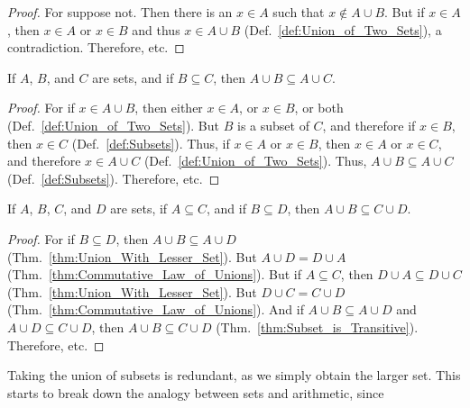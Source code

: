         \begin{proof}
            For suppose not. Then there is an $x\in{A}$ such
            that $x\notin{A}\cup{B}$. But if $x\in{A}$, then
            $x\in{A}$ or $x\in{B}$ and thus $x\in{A}\cup{B}$
            (Def.~\ref{def:Union_of_Two_Sets}), a
            contradiction. Therefore, etc.
        \end{proof}
        \begin{theorem}
            \label{thm:Union_With_Lesser_Set}%
            If $A$, $B$, and $C$ are sets, and if
            $B\subseteq{C}$, then
            $A\cup{B}\subseteq{A}\cup{C}$.
        \end{theorem}
        \begin{proof}
            For if $x\in{A}\cup{B}$, then either $x\in{A}$,
            or $x\in{B}$, or both
            (Def.~\ref{def:Union_of_Two_Sets}). But $B$ is a
            subset of $C$, and therefore if $x\in{B}$, then
            $x\in{C}$ (Def.~\ref{def:Subsets}).
            Thus, if $x\in{A}$ or $x\in{B}$, then
            $x\in{A}$ or $x\in{C}$, and therefore
            $x\in{A}\cup{C}$ (Def.~\ref{def:Union_of_Two_Sets}).
            Thus, $A\cup{B}\subseteq{A}\cup{C}$
            (Def.~\ref{def:Subsets}). Therefore, etc.
        \end{proof}
        \begin{theorem}
            If $A$, $B$, $C$, and $D$ are sets, if
            $A\subseteq{C}$, and if $B\subseteq{D}$, then
            $A\cup{B}\subseteq{C}\cup{D}$.
        \end{theorem}
        \begin{proof}
            For if $B\subseteq{D}$, then
            $A\cup{B}\subseteq{A}\cup{D}$
            (Thm.~\ref{thm:Union_With_Lesser_Set}).
            But $A\cup{D}=D\cup{A}$
            (Thm.~\ref{thm:Commutative_Law_of_Unions}).
            But if $A\subseteq{C}$, then
            $D\cup{A}\subseteq{D}\cup{C}$
            (Thm.~\ref{thm:Union_With_Lesser_Set}). But
            $D\cup{C}=C\cup{D}$
            (Thm.~\ref{thm:Commutative_Law_of_Unions}).
            And if $A\cup{B}\subseteq{A}\cup{D}$ and
            $A\cup{D}\subseteq{C}\cup{D}$, then
            $A\cup{B}\subseteq{C}\cup{D}$
            (Thm.~\ref{thm:Subset_is_Transitive}).
            Therefore, etc.
        \end{proof}
        Taking the union of subsets is redundant, as we
        simply obtain the larger set. This starts to break
        down the analogy between sets and arithmetic, since
